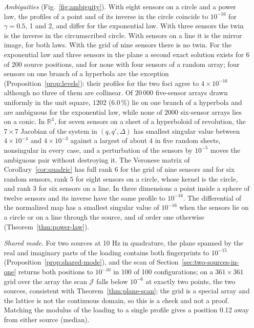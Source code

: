 \documentclass{article}
\begin{document}
\emph{Ambiguities} (Fig.~\ref{fig:ambiguity}). With eight sensors on a circle and a power law, the profiles of a point and of its inverse in the circle coincide to $10^{-16}$ for $\gamma = 0.5$, 1 and 2, and differ for the exponential law. With three sensors the twin is the inverse in the circumscribed circle. With sensors on a line it is the mirror image, for both laws. With the grid of nine sensors there is no twin. For the exponential law and three sensors in the plane a second exact solution exists for 6 of 200 source positions, and for none with four sensors of a random array; four sensors on one branch of a hyperbola are the exception (Proposition~\ref{prop:levels}): their profiles for the two foci agree to $4 \times 10^{-16}$ although no three of them are collinear. Of $20\,000$ five-sensor arrays drawn uniformly in the unit square, $1202$ ($6.0\,\%$) lie on one branch of a hyperbola and are ambiguous for the exponential law, while none of $2000$ six-sensor arrays lies on a conic. In $\mathbb{R}^{3}$, for seven sensors on a sheet of a hyperboloid of revolution, the $7 \times 7$ Jacobian of the system in $(q, q', \Delta)$ has smallest singular value between $4 \times 10^{-4}$ and $4 \times 10^{-3}$ against a largest of about $4$ in five random sheets, nonsingular in every case, and a perturbation of the sensors by $10^{-5}$ moves the ambiguous pair without destroying it. The Veronese matrix of Corollary~\ref{cor:quadric} has full rank $6$ for the grid of nine sensors and for six random sensors, rank $5$ for eight sensors on a circle, whose kernel is the circle, and rank $3$ for six sensors on a line. In three dimensions a point inside a sphere of twelve sensors and its inverse have the same profile to $10^{-16}$. The differential of the normalized map has a smallest singular value of $10^{-16}$ when the sensors lie on a circle or on a line through the source, and of order one otherwise (Theorem~\ref{thm:power-law}).

\emph{Shared mode.} For two sources at 10 Hz in quadrature, the plane spanned by the real and imaginary parts of the loading contains both fingerprints to $10^{-15}$ (Proposition~\ref{prop:shared-mode}), and the scan of Section~\ref{sec:two-sources-in-one} returns both positions to $10^{-10}$ in 100 of 100 configurations; on a $361 \times 361$ grid over the array the scan $\mathcal{J}$ falls below $10^{-6}$ at exactly two points, the two sources, consistent with Theorem~\ref{thm:plane-scan}; the grid is a special array and the lattice is not the continuous domain, so this is a check and not a proof. Matching the modulus of the loading to a single profile gives a position 0.12 away from either source (median).
\end{document}
